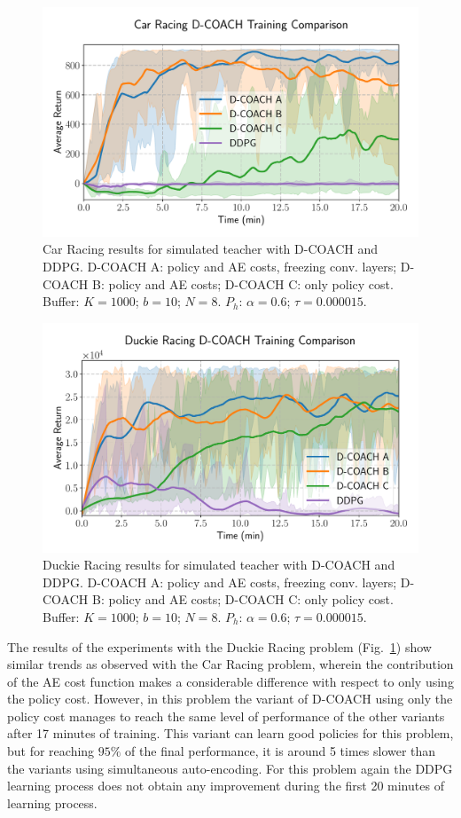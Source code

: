 \begin{figure}[h]
    \centering
    \includegraphics[width=0.9\linewidth]{imagenes/cap3/car_racing_sim_ICRA.pdf}
    \caption{Car Racing results for simulated teacher with D-COACH and DDPG. D-COACH A: policy and AE costs, freezing conv. layers; D-COACH B: policy and AE costs; D-COACH C: only policy cost. Buffer: $K = 1000$; $b = 10$; $N = 8$. $P_{h}$: $\alpha = 0.6$; $\tau = 0.000015$.}
    \label{fig:simulatedteachers}
\end{figure}

\begin{figure}[h]
    \centering
    \includegraphics[width=0.9\linewidth]{imagenes/cap3/duckie_sim_ICRA.pdf}
    \caption{Duckie Racing results for simulated teacher with D-COACH and DDPG. D-COACH A: policy and AE costs, freezing conv. layers; D-COACH B: policy and AE costs; D-COACH C: only policy cost. Buffer: $K = 1000$; $b = 10$; $N = 8$. $P_{h}$: $\alpha = 0.6$; $\tau = 0.000015$.}
    \label{fig:racing_car_results}
\end{figure}

The results of the experiments with the Duckie Racing problem (Fig.~\ref{fig:simulatedteachers}) show similar trends as observed with the Car Racing problem, wherein the contribution of the AE cost function makes a considerable difference with respect to only using the policy cost. However, in this problem the variant of D-COACH using only the policy cost manages to reach the same level of performance of the other variants after 17 minutes of training. This variant can learn good policies for this problem, but for reaching $95\%$ of the final performance, it is around 5 times slower than the variants using simultaneous auto-encoding. For this problem again the DDPG learning process does not obtain any improvement during the first 20 minutes of learning process. 

